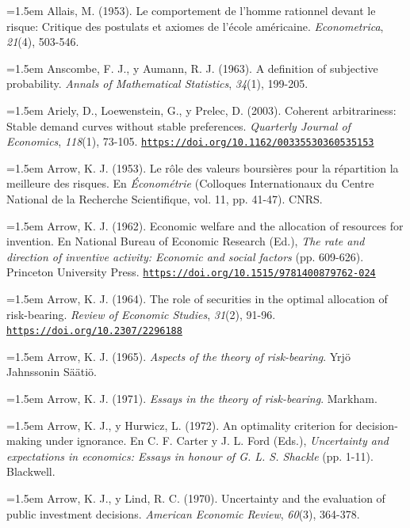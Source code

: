 \documentclass[10pt,a4paper]{article}
\begin{document}
\noindent\hangindent=1.5em Allais, M. (1953). Le comportement de l'homme rationnel devant le risque: Critique des postulats et axiomes de l'école américaine. \textit{Econometrica}, \textit{21}(4), 503-546.

\noindent\hangindent=1.5em Anscombe, F. J., y Aumann, R. J. (1963). A definition of subjective probability. \textit{Annals of Mathematical Statistics}, \textit{34}(1), 199-205.

\noindent\hangindent=1.5em Ariely, D., Loewenstein, G., y Prelec, D. (2003). Coherent arbitrariness: Stable demand curves without stable preferences. \textit{Quarterly Journal of Economics}, \textit{118}(1), 73-105. \href{https://doi.org/10.1162/00335530360535153}{\nolinkurl{https://doi.org/10.1162/00335530360535153}}

\noindent\hangindent=1.5em Arrow, K. J. (1953). Le rôle des valeurs boursières pour la répartition la meilleure des risques. En \textit{Économétrie} (Colloques Internationaux du Centre National de la Recherche Scientifique, vol. 11, pp. 41-47). CNRS.

\noindent\hangindent=1.5em Arrow, K. J. (1962). Economic welfare and the allocation of resources for invention. En National Bureau of Economic Research (Ed.), \textit{The rate and direction of inventive activity: Economic and social factors} (pp. 609-626). Princeton University Press. \href{https://doi.org/10.1515/9781400879762-024}{\nolinkurl{https://doi.org/10.1515/9781400879762-024}}

\noindent\hangindent=1.5em Arrow, K. J. (1964). The role of securities in the optimal allocation of risk-bearing. \textit{Review of Economic Studies}, \textit{31}(2), 91-96. \href{https://doi.org/10.2307/2296188}{\nolinkurl{https://doi.org/10.2307/2296188}}

\noindent\hangindent=1.5em Arrow, K. J. (1965). \textit{Aspects of the theory of risk-bearing}. Yrjö Jahnssonin Säätiö.

\noindent\hangindent=1.5em Arrow, K. J. (1971). \textit{Essays in the theory of risk-bearing}. Markham.

\noindent\hangindent=1.5em Arrow, K. J., y Hurwicz, L. (1972). An optimality criterion for decision-making under ignorance. En C. F. Carter y J. L. Ford (Eds.), \textit{Uncertainty and expectations in economics: Essays in honour of G. L. S. Shackle} (pp. 1-11). Blackwell.

\noindent\hangindent=1.5em Arrow, K. J., y Lind, R. C. (1970). Uncertainty and the evaluation of public investment decisions. \textit{American Economic Review}, \textit{60}(3), 364-378.
\end{document}
